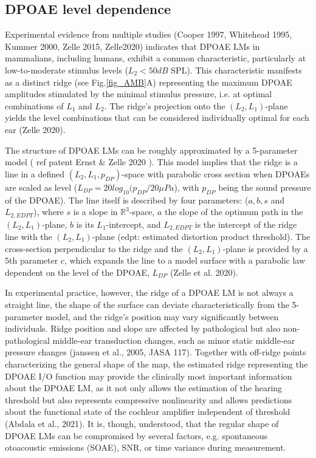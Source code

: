 \documentclass[journal,twoside,web]{ieeecolor2}
\begin{document}
\subsection{DPOAE level dependence}
Experimental evidence from multiple studies (Cooper 1997, Whitehead 1995, Kummer 2000, Zelle 2015, Zelle2020) indicates that DPOAE LMs in mammalians, including humans, exhibit a common characteristic, particularly at low-to-moderate stimulus levels ($L_2<50 dB$ SPL).
This characteristic manifests as a distinct ridge (see Fig.\ref{fig_AMB}A) representing the maximum DPOAE amplitudes stimulated by the minimal stimulus pressure, i.e. at optimal combinations of $L_1$ and $L_2$.
The ridge’s projection onto the $(L_2, L_1)$-plane yields the level combinations that can be considered individually optimal for each ear (Zelle 2020).
 
The structure of DPOAE LMs can be roughly approximated by a 5-parameter model ( ref patent Ernst \& Zelle 2020 ).
This model implies that the ridge is a line in a defined $(L_2, L_1, p_{DP})$-space with parabolic cross section when DPOAEs are scaled as level ($L_{DP}=20 log_{10} (p_{DP}/20 \mu Pa$), with $p_{DP}$ being the sound pressure of the DPOAE).
The line itself is described by four parameters: ($a, b, s$ and $L_{2,EDPT}$), where $s$ is a slope in $\mathbb{R}^3$-space, $a$ the slope of the optimum path in the $(L_2, L_1)$-plane, $b$ is its $L_1$-intercept, and $L_{2,EDPT}$ is the intercept of the ridge line with the $(L_2, L_1)$-plane (edpt: estimated distortion product threshold).
The cross-section perpendicular to the ridge and the $(L_2, L_1)$-plane is provided by a 5th parameter $c$, which expands the line to a model surface with a parabolic law dependent on the level of the DPOAE, $L_{DP}$ (Zelle et al. 2020).

In experimental practice, however, the ridge of a DPOAE LM is not always a straight line, the shape of the surface can deviate characteristically from the 5-parameter model, and the ridge’s position may vary significantly between individuals.
Ridge position and slope are affected by pathological but also non-pathological middle-ear transduction changes, such as minor static middle-ear pressure changes (janssen et al., 2005, JASA 117).
Together with off-ridge points characterizing the general shape of the map, the estimated ridge representing the DPOAE I/O function may provide the clinically most important information about the DPOAE LM, as it not only allows the estimation of the hearing threshold but also represents compressive nonlinearity and allows predictions about the functional state of the cochlear amplifier independent of threshold (Abdala et al., 2021).
It is, though, understood, that the regular shape of DPOAE LMs can be compromised by several factors, e.g. spontaneous otoacoustic emissions (SOAE), SNR, or time variance during measurement.
\end{document}
